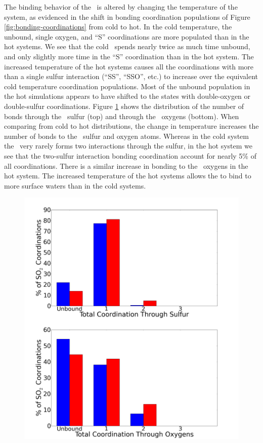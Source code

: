 The binding behavior of the \suldiox~is altered by changing the temperature of the system, as evidenced in the shift in bonding coordination populations of Figure \ref{fig:bonding-coordinations} from cold to hot. In the cold temperature, the unbound, single oxygen, and ``S'' coordinations are more populated than in the hot systems. We see that the cold \suldiox~spends nearly twice as much time unbound, and only slightly more time in the ``S'' coordination than in the hot system. The increased temperature of the hot systems causes all the coordinations with more than a single sulfur interaction (``SS'', ``SSO'', etc.) to increase over the equivalent cold temperature coordination populations. Most of the unbound population in the hot simulations appears to have shifted to the states with double-oxygen or double-sulfur coordinations. Figure \ref{fig:coordination-breakdown} shows the distribution of the number of bonds through the \suldiox~sulfur (top) and through the \suldiox~oxygens (bottom). When comparing from cold to hot distributions, the change in temperature increases the number of bonds to the \suldiox~sulfur and oxygen atoms. Whereas in the cold system the \suldiox~very rarely forms two interactions through the sulfur, in the hot system we see that the two-sulfur interaction bonding coordination account for nearly 5\% of all coordinations. There is a similar increase in bonding to the \suldiox~oxygens in the hot system. The increased temperature of the hot systems allows the \suldiox to bind to more surface waters than in the cold systems.

\begin{figure}[h!]
	\begin{center}
		\includegraphics[scale=1.0]{images/coordinations/coordination-breakdown-small.png}
		\caption{}
		\label{fig:coordination-breakdown}
	\end{center}
\end{figure}

